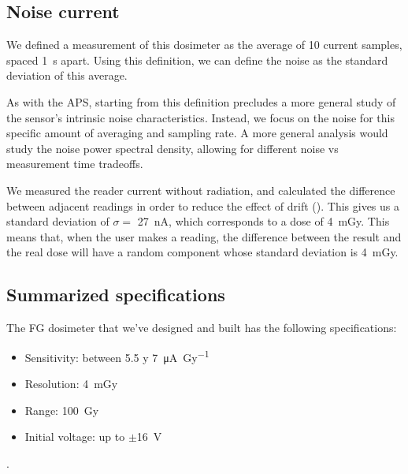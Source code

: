 \subsection{Noise current}
We defined a measurement of this dosimeter as the average of 10 current samples,
spaced \SI{1}{\second} apart.
Using this definition, we can define the noise as the standard deviation of this average.

As with the APS, starting from this definition precludes a more general study
of the sensor's intrinsic noise characteristics.
Instead, we focus on the noise for this specific amount of averaging and sampling rate.
A more general analysis would study the noise power spectral density,
allowing for different noise vs measurement time tradeoffs.

We measured the reader current without radiation,
and calculated the difference between adjacent readings in order to reduce the effect of drift
().
This gives us a standard deviation of
$\sigma=$ \SI{27}{\nano\ampere},
which corresponds to a dose of \SI{4}{\milli\gray}.
This means that, when the user makes a reading,
the difference between the result and the real dose
will have a random component whose standard deviation is
\SI{4}{\milli\gray}.
\subsection{Summarized specifications}
The FG dosimeter that we've designed and built has the following specifications:
\begin{itemize}
    \item Sensitivity: between 5.5 y \SI{7}{\micro\ampere\per\gray}
    \item Resolution: \SI{4}{\milli\gray}
    \item Range: \SI{100}{\gray}
    \item Initial voltage: up to $\pm$\SI{16}{\volt}
\end{itemize}.
